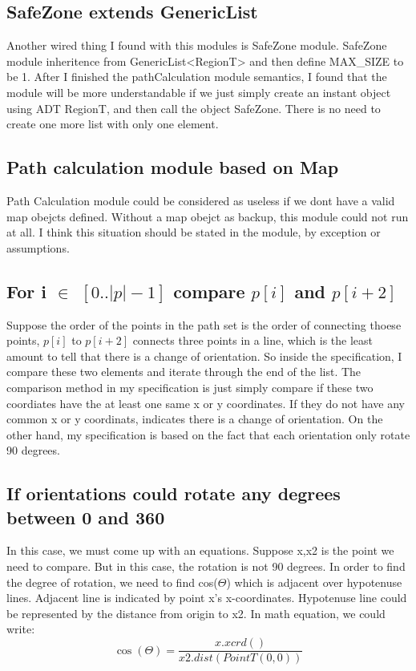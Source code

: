 \documentclass[12pt]{article}
\begin{document}
\subsection*{SafeZone extends GenericList}
Another wired thing I found with this modules is SafeZone module. SafeZone module inheritence from GenericList<RegionT> and then define MAX\_SIZE to be 1. After I finished the pathCalculation module semantics, I found that the module will be more understandable if we just simply create an instant object using ADT RegionT, and then call the object SafeZone. There is no need to create one more list with only one element.

\subsection*{Path calculation module based on Map}
Path Calculation module could be considered as useless if we dont have a valid map obejcts defined. Without a map obejct as backup, this module could not run at all. I think this situation should be stated in the module, by exception or assumptions.

\subsection*{For i $\in$ $[0 .. |p|-1]$ compare $p[i]$ and $p[i+2]$}
Suppose the order of the points in the path set is the order of connecting thoese points, $p[i]$ to $p[i+2]$ connects three points in a line, which is the least amount to tell that there is a change of orientation. So inside the specification, I compare these two elements and iterate through the end of the list. The comparison method in my specification is just simply compare if these two coordiates have the at least one same x or y coordinates. If they do not have any common x or y coordinats, indicates there is a change of orientation. On the other hand, my specification is based on the fact that each orientation only rotate 90 degrees.

\subsection*{If orientations could rotate any degrees between 0 and 360}
In this case, we must come up with an equations. Suppose x,x2 is the point we need to compare. But in this case, the rotation is not 90 degrees. In order to find the degree of rotation, we need to find cos($\Theta$) which is adjacent over hypotenuse lines. Adjacent line is indicated by point x's x-coordinates. Hypotenuse line could be represented by the distance from origin to x2. In math equation, we could write:
\begin{displaymath}
\cos(\Theta) = \frac{x.xcrd()}{x2.dist(PointT(0,0))}
\end{displaymath}
\end{document}
